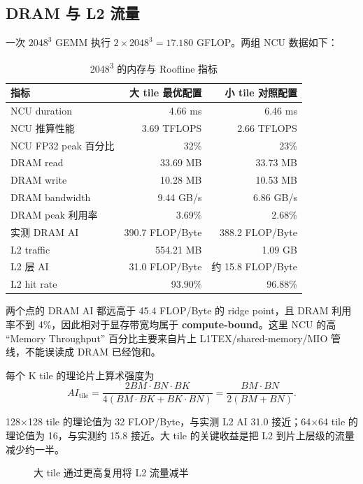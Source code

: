 \documentclass[UTF8,11pt,a4paper,fontset=fandol]{ctexart}
\begin{document}
\subsection{DRAM 与 L2 流量}

一次 $2048^3$ GEMM 执行 $2\times2048^3=17.180$ GFLOP。两组 NCU 数据如下：

\begin{table}[H]
\centering
\caption{2048\textsuperscript{3} 的内存与 Roofline 指标}
\begin{tabular}{lrr}
\toprule
指标 & 大 tile 最优配置 & 小 tile 对照配置 \\
\midrule
NCU duration & 4.66 ms & 6.46 ms \\
NCU 推算性能 & 3.69 TFLOPS & 2.66 TFLOPS \\
NCU FP32 peak 百分比 & 32\% & 23\% \\
DRAM read & 33.69 MB & 33.73 MB \\
DRAM write & 10.28 MB & 10.53 MB \\
DRAM bandwidth & 9.44 GB/s & 6.86 GB/s \\
DRAM peak 利用率 & 3.69\% & 2.68\% \\
实测 DRAM AI & 390.7 FLOP/Byte & 388.2 FLOP/Byte \\
L2 traffic & 554.21 MB & 1.09 GB \\
L2 层 AI & 31.0 FLOP/Byte & 约 15.8 FLOP/Byte \\
L2 hit rate & 93.90\% & 96.88\% \\
\bottomrule
\end{tabular}
\end{table}

两个点的 DRAM AI 都远高于 45.4 FLOP/Byte 的 ridge point，且 DRAM 利用率不到 4\%，因此相对于显存带宽均属于 \textbf{compute-bound}。这里 NCU 的高 ``Memory Throughput'' 百分比主要来自片上 L1TEX/shared-memory/MIO 管线，不能误读成 DRAM 已经饱和。

每个 K tile 的理论片上算术强度为
\begin{equation}
AI_{\mathrm{tile}}=
\frac{2BM\cdot BN\cdot BK}
{4(BM\cdot BK+BK\cdot BN)}
=\frac{BM\cdot BN}{2(BM+BN)}.
\end{equation}

128$\times$128 tile 的理论值为 32 FLOP/Byte，与实测 L2 AI 31.0 接近；64$\times$64 tile 的理论值为 16，与实测约 15.8 接近。大 tile 的关键收益是把 L2 到片上层级的流量减少约一半。

\begin{figure}[H]
\centering
{}
\caption{大 tile 通过更高复用将 L2 流量减半}
\label{fig:l2traffic}
\end{figure}
\end{document}
